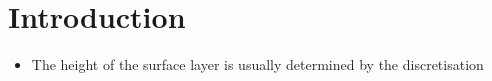 \section{Introduction}
\begin{itemize}
\item The height of the surface layer
is usually determined by the discretisation
\end{itemize}
